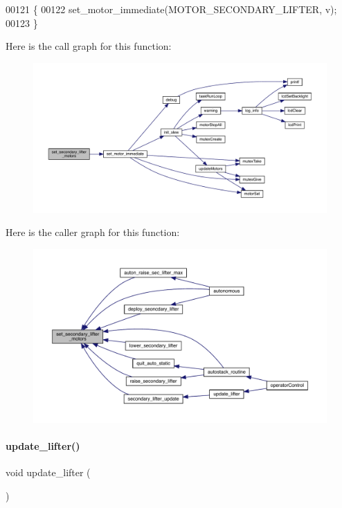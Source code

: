 \begin{DoxyCode}
00121                                               \{
00122   set_motor_immediate(MOTOR\_SECONDARY\_LIFTER, v);
00123 \}
\end{DoxyCode}
Here is the call graph for this function\+:
\nopagebreak
\begin{figure}[H]
\begin{center}
\leavevmode
\includegraphics[width=350pt]{lifter_8h_a78640d547d9361951a92d0bc00939536_cgraph}
\end{center}
\end{figure}
Here is the caller graph for this function\+:
\nopagebreak
\begin{figure}[H]
\begin{center}
\leavevmode
\includegraphics[width=350pt]{lifter_8h_a78640d547d9361951a92d0bc00939536_icgraph}
\end{center}
\end{figure}
\mbox{\label{lifter_8h_a59bb7413777ca16aba124aaedf95c79b}} 
\paragraph{update\+\_\+lifter()}
{\footnotesize\ttfamily void update\+\_\+lifter (\begin{DoxyParamCaption}{ }\end{DoxyParamCaption})}



